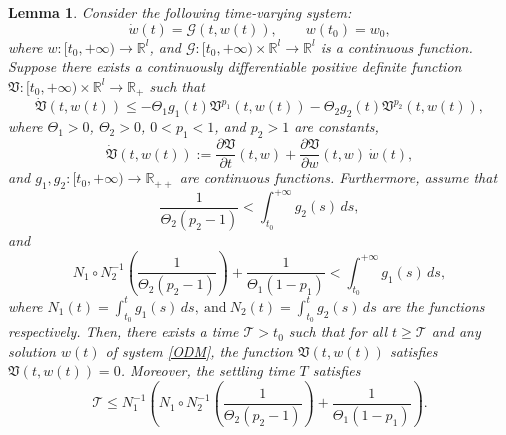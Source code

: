 \documentclass{article}
\theoremstyle{plain}%
\newtheorem{lemma}{Lemma}[section]%
\theoremstyle{thmstyletwo}%
\theoremstyle{thmstylethree}%
\begin{document}
\begin{lemma}\label{lemFXtime}\cite{TVl1}
Consider the following time-varying system:
\begin{equation}\label{ODM}
\dot{w}(t) = \mathcal{G}(t,w(t)), \qquad w(t_0)=w_0,
\end{equation}
where $w:[t_0,+\infty)\to\mathbb{R}^l$, and
$\mathcal{G}:[t_0,+\infty)\times\mathbb{R}^l\to\mathbb{R}^l$ is a continuous function.
Suppose there exists a continuously differentiable positive definite
function $\mathfrak{V}:[t_0,+\infty)\times\mathbb{R}^l\to\mathbb{R}_+$ such that
\begin{equation}
\dot {\mathfrak{V}}(t,w(t))
\le
- \Theta_1 g_1(t) \mathfrak{V}^{p_1}(t,w(t))
- \Theta_2 g_2(t) \mathfrak{V}^{p_2}(t,w(t)),
\end{equation}
where $\Theta_1>0$, $\Theta_2>0$, $0<p_1<1$, and $p_2>1$ are constants,
\[
\dot {\mathfrak{V}}(t,w(t))
:=
\frac{\partial \mathfrak{V}}{\partial t}(t,w)
+
\frac{\partial \mathfrak{V}}{\partial w
}(t,w)\,\dot w(t),
\]
and $g_1,g_2:[t_0,+\infty)\to\mathbb{R}_{++}$ are continuous functions.
Furthermore, assume that
\begin{equation}
\frac{1}{\Theta_2(p_2-1)}
<
\int_{t_0}^{+\infty} g_2(s)\,ds,
\end{equation}
and
\begin{equation}
N_1\circ N_2^{-1}
\!\left(\frac{1}{\Theta_2(p_2-1)}\right)
+
\frac{1}{\Theta_1(1-p_1)}
<
\int_{t_0}^{+\infty} g_1(s)\,ds,
\end{equation}
where
\(N_1(t)=\int_{t_0}^{t} g_1(s)\,ds, \ \text{and} \ 
N_2(t)=\int_{t_0}^{t} g_2(s)\,ds 
\) are the functions respectively. Then, there exists a time $\mathcal{T}>t_0$ such that for all $t\ge\mathcal{T}$ and any solution
$w(t)$ of system \eqref{ODM}, the function $\mathfrak{V}(t,w(t))$ satisfies
$
\mathfrak{V}(t,w(t))=0$.
Moreover, the settling time $T$ satisfies
\begin{equation}
\mathcal{T}
\le
N_1^{-1}
\!\left(
N_1\circ N_2^{-1}
\!\left(\frac{1}{\Theta_2(p_2-1)}\right)
+
\frac{1}{\Theta_1(1-p_1)}
\right).
\end{equation}\\
\end{lemma}
\end{document}
